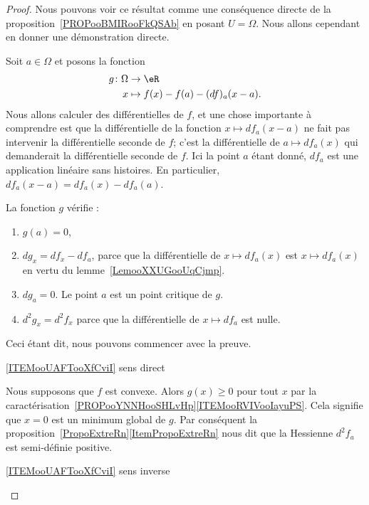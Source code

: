 \begin{proof}
    Nous pouvons voir ce résultat comme une conséquence directe de la proposition~\ref{PROPooBMIRooFkQSAb} en posant \( U=\Omega\). Nous allons cependant en donner une démonstration directe.

    Soit \( a\in \Omega\) et posons la fonction
    \begin{equation}
        \begin{aligned}
            g\colon \Omega&\to \eR \\
            x&\mapsto f(x)-f(a)-(df)_a(x-a).
        \end{aligned}
    \end{equation}
    Nous allons calculer des différentielles de \( f\), et une chose importante à comprendre est que la différentielle de la fonction \( x\mapsto df_a(x-a)\) ne fait pas intervenir la différentielle seconde de \( f\); c'est la différentielle de \( a\mapsto df_a(x)\) qui demanderait la différentielle seconde de \( f\). Ici la point \( a\) étant donné, \( df_a\) est une application linéaire sans histoires. En particulier, \( df_a(x-a)=df_a(x)-df_a(a)\).

    La fonction \( g\) vérifie :
    \begin{enumerate}
        \item
            \( g(a)=0\),
        \item
            \( dg_x=df_x-df_a\), parce que la différentielle de \( x\mapsto df_a(x)\) est \( x\mapsto df_a(x)\) en vertu du lemme~\ref{LemooXXUGooUqCjmp}.
        \item
            \( dg_a=0\). Le point \( a\) est un point critique de \( g\).
        \item
            \( d^2g_x=d^2f_x\) parce que la différentielle de \( x\mapsto df_a\) est nulle.
    \end{enumerate}
    Ceci étant dit, nous pouvons commencer avec la preuve.
    \begin{subproof}
        \item[\ref{ITEMooUAFTooXfCviI} sens direct]

            Nous supposons que \( f\) est convexe. Alors \( g(x)\geq 0\) pour tout \( x\) par la caractérisation~\ref{PROPooYNNHooSHLvHp}\ref{ITEMooRVIVooIayuPS}. Cela signifie que \( x=0\) est un minimum global de \( g\). Par conséquent la proposition~\ref{PropoExtreRn}\ref{ItemPropoExtreRn} nous dit que la Hessienne \( d^2f_a\) est semi-définie positive.


        \item[\ref{ITEMooUAFTooXfCviI} sens inverse]


\end{subproof}
\end{proof}
